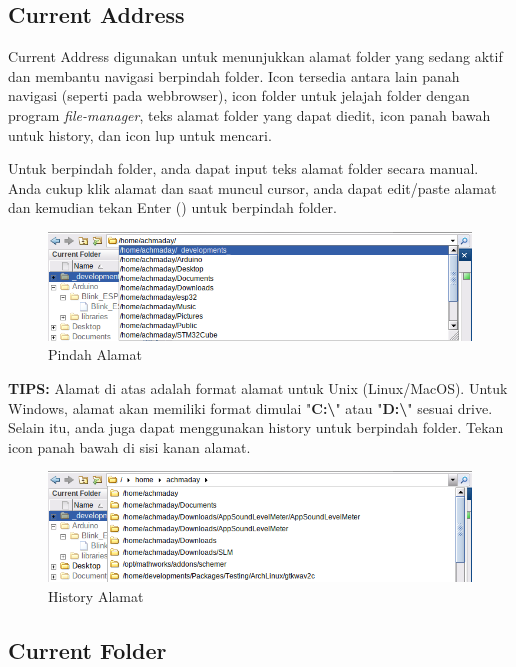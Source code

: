 \documentclass[12pt]{book}
\begin{document}
	\subsection{Current Address}

	Current Address digunakan untuk menunjukkan alamat folder yang sedang aktif dan membantu navigasi berpindah folder.
	Icon tersedia antara lain panah navigasi (seperti pada webbrowser), icon folder untuk jelajah folder dengan program \textit{file-manager},
	teks alamat folder yang dapat diedit, icon panah bawah untuk history, dan icon lup untuk mencari.

	Untuk berpindah folder, anda dapat input teks alamat folder secara manual.
	Anda cukup klik alamat dan saat muncul cursor, anda dapat edit/paste alamat dan kemudian tekan Enter (\keys{\return}) untuk berpindah folder.

	\begin{figure}[!ht]
		\centering
		\includegraphics[width=350pt]{images/addressbaredit}
		\caption{Pindah Alamat}
	\end{figure}

	\textbf{TIPS:} Alamat di atas adalah format alamat untuk Unix (Linux/MacOS).
	Untuk Windows, alamat akan memiliki format dimulai "\textbf{C:\textbackslash}" atau "\textbf{D:\textbackslash}" sesuai drive.\\

	Selain itu, anda juga dapat menggunakan history untuk berpindah folder.
	Tekan icon panah bawah di sisi kanan alamat.

	\begin{figure}[!ht]
		\centering
		\includegraphics[width=350pt]{images/addressbarhistory}
		\caption{History Alamat}
	\end{figure}

	\newpage
	\subsection{Current Folder}
\end{document}
